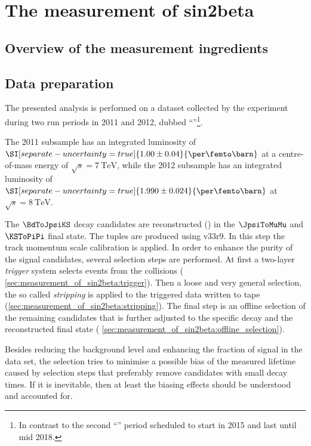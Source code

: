 
\chapter{The measurement of sin2beta}
\label{ch:measurement_of_sin2beta}

\section{Overview of the measurement ingredients}
\label{sec:measurement_of_sin2beta:overview}

\section{Data preparation}
\label{sec:measurement_of_sin2beta:data_preparation}

The presented analysis is performed on a dataset collected by the \LHCb
experiment during two run periods in 2011 and 2012, dubbed
\enquote{\RunOne}\footnote{In contrast to the second \enquote{\RunTwo} period
scheduled to start in 2015 and last until mid 2018.}.

The 2011 subsample has an integrated luminosity of
$\SI[separate-uncertainty=true]{1.00\pm0.04}{\per\femto\barn}$ at a
centre-of-mass energy of $\sqrt{s}=\SI{7}{\TeV}$, while the 2012 subsample has
an integrated luminosity of
$\SI[separate-uncertainty=true]{1.990\pm0.024}{\per\femto\barn}$ at
$\sqrt{s}=\SI{8}{\TeV}$.

The $\BdToJpsiKS$ decay candidates are reconstructed (\RecoFourteen) in the
$\JpsiToMuMu$ and $\KSToPiPi$ final state. The tuples are produced using
\DaVinci v33r9. In this step the track momentum scale calibration
\cite{Needham:2008zzc} is applied. In order to enhance the purity of the signal
candidates, several selection steps are performed. At first a two-layer
\emph{trigger} system selects events from the \protonproton collisions (\cf
\cref{sec:measurement_of_sin2beta:trigger}). Then a loose and very general
selection, the so called \emph{stripping} is applied to the triggered data
written to tape (\cf \cref{sec:measurement_of_sin2beta:stripping}). The final
step is an offline selection of the remaining candidates that is further
adjusted to the specific decay and the reconstructed final state (\cf
\cref{sec:measurement_of_sin2beta:offline_selection}).

Besides reducing the background level and enhancing the fraction of signal in
the data set, the selection tries to minimise a possible bias of the measured
\Bd lifetime caused by selection steps that preferably remove candidates with
small decay times. If it is inevitable, then at least the biasing effects should
be understood and accounted for.

